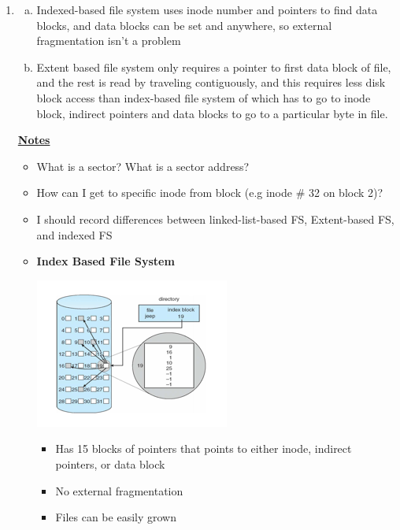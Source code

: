 \documentclass[12pt]{article}
\begin{document}
\begin{enumerate}[1.]
    \item

    \begin{enumerate}[a)]
        \item Indexed-based file system uses inode number and pointers to find data blocks, and
        data blocks can be set and anywhere, so external fragmentation isn't a problem

        \item Extent based file system only requires a pointer to first data block of file,
        and the rest is read by traveling contiguously, and this requires less disk block access
        than index-based file system of which has to go to inode block, indirect pointers and
        data blocks to go to a particular byte in file.
    \end{enumerate}

    \bigskip

    \underline{\textbf{Notes}}

    \begin{itemize}
        \item What is a sector? What is a sector address?
        \item How can I get to specific inode from block (e.g inode \# 32 on block 2)?
        \item I should record differences between linked-list-based FS, Extent-based FS, and indexed FS
        \item \textbf{Index Based File System}

        \begin{center}
        \includegraphics[width=0.6\linewidth]{../images/midterm_4_solution_29.png}
        \end{center}

        \begin{itemize}
            \item Has 15 blocks of pointers that points to either inode, indirect pointers, or data block
            \item No external fragmentation
            \item Files can be easily grown
        \end{itemize}


\end{itemize}
\end{enumerate}
\end{document}
